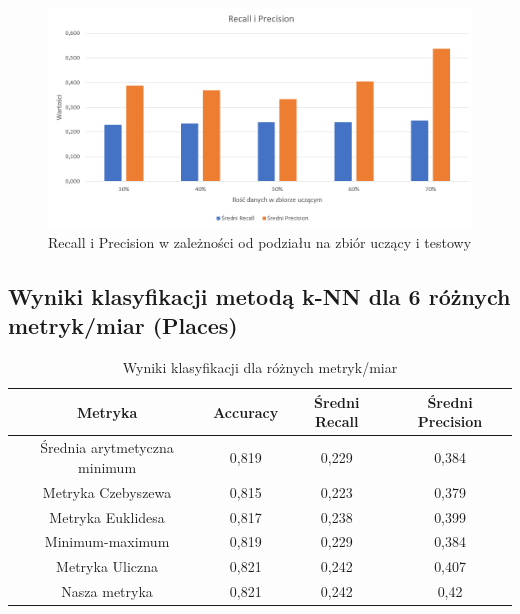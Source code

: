 \documentclass{classrep}
\begin{document}
{\begin{figure}[H]
\caption{Recall i Precision w zależności od podziału na zbiór uczący i testowy}
\centering
\includegraphics[width=1\textwidth]{i4}
\end{figure}

\subsection{Wyniki klasyfikacji metodą k-NN dla 6 różnych metryk/miar (Places)}

\begin{table}[h]
\begin{center}
\caption{Wyniki klasyfikacji dla różnych metryk/miar}
\begin{tabular}{|c|c|c|c|}
\hline
\textbf{Metryka}             & \textbf{Accuracy} & \textbf{Średni Recall} & \textbf{Średni Precision} \\ \hline
Średnia arytmetyczna minimum & 0,819             & 0,229                  & 0,384                     \\ \hline
Metryka Czebyszewa           & 0,815             & 0,223                  & 0,379                     \\ \hline
Metryka Euklidesa            & 0,817             & 0,238                  & 0,399                     \\ \hline
Minimum-maximum              & 0,819             & 0,229                  & 0,384                     \\ \hline
Metryka Uliczna              & 0,821             & 0,242                  & 0,407                     \\ \hline
Nasza metryka                & 0,821             & 0,242                  & 0,42                      \\ \hline
\end{tabular}
\end{center}
\end{table}

}
\end{document}
